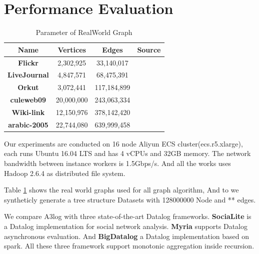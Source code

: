 \section{Performance Evaluation}
\label{sec:expr}

\begin{table}[!t]
	\caption{Parameter of RealWorld Graph }
	\hspace{-0.15in}
	\vspace{0.0in}
	\label{tab:Dataset}
	\centering
	\small
	\begin{tabular}{c|c|c|c}
		\hline\hline
		{\textbf{Name}} &
		{\textbf{Vertices}} &
		{\textbf{Edges}} &
		{\textbf{Source}} \\
		\hline
		{\textbf{Flickr}} & 2,302,925 &33,140,017   & \cite{mislove-2008-flickr}\\
		\hline
		{\textbf{LiveJournal}} & 4,847,571 & 68,475,391 &\cite{livejournal}\\
		\hline
		{\textbf{Orkut}} &3,072,441& 117,184,899 & \cite{mislove-2007-socialnetworks} \\
		\hline
		{\textbf{culeweb09}} & 20,000,000 & 243,063,334 &\cite{clueweb}\\		\hline
		{\textbf{Wiki-link}} & 12,150,976 &378,142,420&\cite{wikilinks} \\
		\hline
		{\textbf{arabic-2005}} & 22,744,080 & 639,999,458 &\cite{arabic-2005}\\		\hline
		\hline
	\end{tabular}
	\vspace{-0.1in}
	
\end{table}
Our experiments are conducted on 16 node Aliyun ECS cluster(ecs.r5.xlarge), each runs Ubuntu 16.04 LTS and has 4 vCPUs and 32GB memory. The network bandwidth between instance workers is 1.5Gbps/s. And all the works uses Hadoop 2.6.4 as distributed file system.

Table \ref{tab:Dataset} shows the real world graphs used for all graph algorithm, And to we syntheticly generate a tree structure Datasets with 128000000 Node and  ** edges. 

We compare A3log with three state-of-the-art Datalog frameworks. \textbf{SociaLite} \cite{Lam:2013:SDE:2510649.2511289,Seo:2013:DSD:2556549.2556572} is a Datalog implementation for social network analysis. \textbf{Myria} \cite{Halperin:2014:DMB:2588555.2594530,Wang:2015:AFR:2824032.2824052} supports Datalog asynchronous evaluation. And \textbf{BigDatalog}\cite{Shkapsky:2016:BDA:2882903.2915229} a Datalog implementation based on spark. All these three framework support monotonic aggregation inside recursion.


